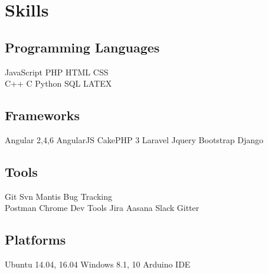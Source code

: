 \documentclass[]{deedy-resume-openfont}
\begin{document}
%
%



%
%

\begin{minipage}[t]{0.33\textwidth} 


\section{Skills}
\subsection{Programming Languages}

JavaScript \textbullet{}   PHP \textbullet{} HTML \textbullet{} CSS \\
C++ \textbullet{} C \textbullet{} Python \textbullet{} SQL \textbullet{} LATEX 
\sectionsep

\subsection{Frameworks}
Angular 2,4,6  \textbullet{}AngularJS \textbullet{} CakePHP 3 \newline \textbullet{} Laravel \textbullet{} Jquery \textbullet{} Bootstrap \textbullet{} Django 
\sectionsep

\subsection{Tools}
Git \textbullet{} Svn \textbullet{} Mantis Bug Tracking \\ \textbullet{} Postman  \textbullet{} Chrome Dev Tools \textbullet{} Jira \newline \textbullet{} Aasana \textbullet{} Slack \textbullet{} Gitter
\sectionsep

\subsection{Platforms}
Ubuntu 14.04, 16.04 \textbullet{} Windows 8.1, 10 \newline \textbullet{} Arduino IDE


\end{minipage}
\end{document}
